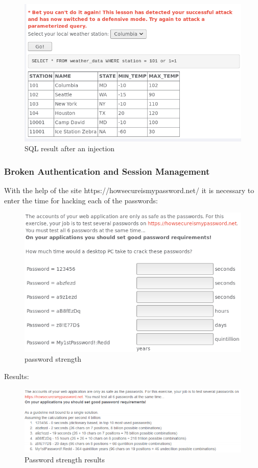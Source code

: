 \documentclass[14pt,a4paper,report]{report}
\begin{document}
\begin{figure}[h!]
	\centering
	\includegraphics[scale = 0.61]{images/7.png}
	\caption{SQL result after an injection}
\end{figure}

\subsubsection{Broken Authentication and Session Management}

With the help of the site https://howsecureismypassword.net/ it is necessary to enter the time for hacking each of the passwords:

\begin{figure}[h!]
	\centering
	\includegraphics[scale = 0.60]{images/8.png}
	\caption{password strength}
\end{figure}

Results:

\begin{figure}[h!]
	\centering
	\includegraphics[scale = 0.60]{images/9.png}
	\caption{Password strength results}
\end{figure}
\end{document}
